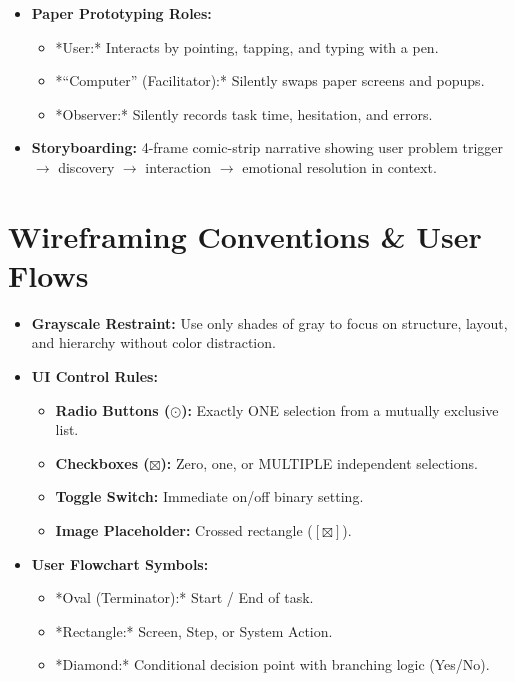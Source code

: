 \begin{itemize}[leftmargin=1.2em, itemsep=3pt]
    \item \textbf{Paper Prototyping Roles:}
    \begin{itemize}
        \item *User:* Interacts by pointing, tapping, and typing with a pen.
        \item *``Computer'' (Facilitator):* Silently swaps paper screens and popups.
        \item *Observer:* Silently records task time, hesitation, and errors.
    \end{itemize}
    \item \textbf{Storyboarding:} 4-frame comic-strip narrative showing user problem trigger $\rightarrow$ discovery $\rightarrow$ interaction $\rightarrow$ emotional resolution in context.
\end{itemize}

\section{Wireframing Conventions \& User Flows}

\begin{itemize}[leftmargin=1.2em, itemsep=3pt]
    \item \textbf{Grayscale Restraint:} Use only shades of gray to focus on structure, layout, and hierarchy without color distraction.
    \item \textbf{UI Control Rules:}
    \begin{itemize}
        \item \textbf{Radio Buttons ($\odot$):} Exactly ONE selection from a mutually exclusive list.
        \item \textbf{Checkboxes ($\boxtimes$):} Zero, one, or MULTIPLE independent selections.
        \item \textbf{Toggle Switch:} Immediate on/off binary setting.
        \item \textbf{Image Placeholder:} Crossed rectangle ($[\boxtimes]$).
    \end{itemize}
    \item \textbf{User Flowchart Symbols:}
    \begin{itemize}
        \item *Oval (Terminator):* Start / End of task.
        \item *Rectangle:* Screen, Step, or System Action.
        \item *Diamond:* Conditional decision point with branching logic (Yes/No).
    \end{itemize}
\end{itemize}

